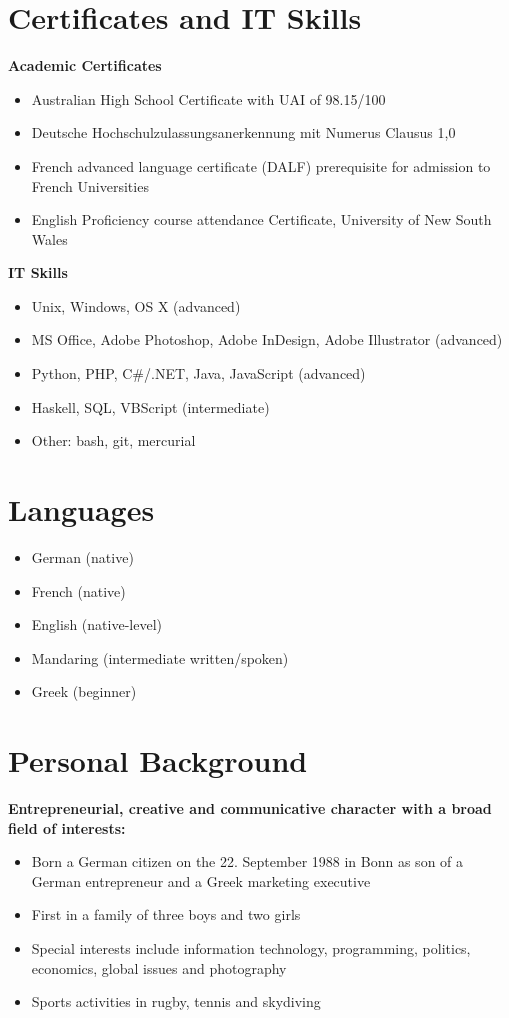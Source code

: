 \documentclass[margin]{res}
\begin{document}
\begin{resume}
\section{Certificates and IT Skills}
  {\bf Academic Certificates}
  \begin{itemize} \itemsep -0.5pt  %
  \item Australian High School Certificate with UAI of 98.15/100
  \item Deutsche Hochschulzulassungsanerkennung mit Numerus Clausus 1,0
  \item French advanced language certificate (DALF) prerequisite for admission to French Universities
  \item English Proficiency course attendance Certificate, University of New South Wales
  \end{itemize}
  {\bf IT Skills}
  \begin{itemize} \itemsep -0.5pt  %
  \item Unix, Windows, OS X (advanced)
  \item MS Office, Adobe Photoshop, Adobe InDesign, Adobe Illustrator (advanced)
  \item Python, PHP, C\#/.NET, Java, JavaScript (advanced)
  \item Haskell, SQL, VBScript (intermediate)
  \item Other: bash, git, mercurial
  \end{itemize}

\section{Languages}
  \begin{itemize} \itemsep -0.5pt  %
  \item German (native)
  \item French (native)
  \item English (native-level)
  \item Mandaring (intermediate written/spoken)
  \item Greek (beginner)
  \end{itemize}

\section{Personal Background}
{\bf Entrepreneurial, creative and communicative character with a broad field of interests:}
  \begin{itemize} \itemsep -0.5pt  %
  \item Born a German citizen on the 22. September 1988 in Bonn as son of a German entrepreneur and a Greek marketing executive
  \item First in a family of three boys and two girls
  \item Special interests include information technology, programming, politics, economics, global issues and photography
  \item Sports activities in rugby, tennis and skydiving
  \end{itemize}


\end{resume}
\end{document}
